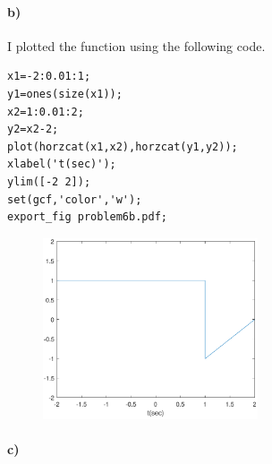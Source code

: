 \documentclass[12pt]{article}
\begin{document}
\paragraph{b)}

I plotted the function using the following code.
\begin{verbatim}
x1=-2:0.01:1;
y1=ones(size(x1));
x2=1:0.01:2;
y2=x2-2;
plot(horzcat(x1,x2),horzcat(y1,y2));
xlabel('t(sec)');
ylim([-2 2]);
set(gcf,'color','w');
export_fig problem6b.pdf;
\end{verbatim}
\begin{figure}[H]
    \begin{center}
        \includegraphics[width=2.5in]{problem6b.pdf}
    \end{center}
\end{figure}

\paragraph{c)}
\end{document}
